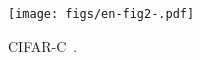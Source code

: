 
\begin{figure}
    \centering
    \texttt{[image: figs/en-fig2-.pdf]}
    \vspace{-12pt}
    \caption{CIFAR-C~\cite{ImageNet-C}.}
    \label{figCIFARC}
\end{figure}
